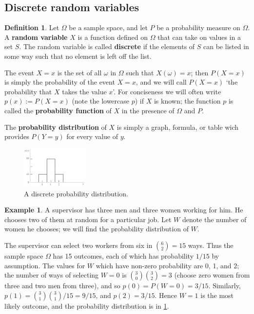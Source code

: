 \documentclass[a4paper,leqno]{article}
\numberwithin{equation}{section}
\theoremstyle{definition}
\newtheorem{defn}[equation]{Definition}
\newtheorem{ex}[equation]{Example}
\theoremstyle{remark}
\newcommand{\df}{\textbf}
\begin{document}
\subsection{Discrete random variables}

\begin{defn}\label{defn:randomvar1}
  Let $ \Omega $ be a sample space, and let $ P $ be a probability measure on $ \Omega $. A \df{random variable} $ X $ is a function defined
  on $ \Omega $ that can take on values in a set $ S $. The random variable is called \df{discrete} if the elements of $ S $ can be listed in
  some way such that no element is left off the list.

  The event $ X = x $ is the set of all $ \omega $ in $ \Omega $ such that $ X(\omega) = x $; then $ P(X = x) $ is simply the probability
  of the event $ X = x $, and we will call $ P(X = x) $ `the probability that $ X $ takes the value $ x $'. For conciseness we will often
  write $ p(x) := P(X = x) $ (note the lowercase $ p $) if $ X $ is known; the function $ p $ is called the \df{probability function} of $ X $
  in the presence of $ \Omega $ and $ P $.

  The \df{probability distribution} of $ X $ is simply a graph, formula, or table wich provides $ P(Y = y) $ for every value of $ y $.
\end{defn}

\begin{figure}
  \centering
  \includegraphics[width=0.3\textwidth]{pd1}
  \caption{A discrete probability distribution.\label{fig:pd1}}
\end{figure}

\begin{ex}\label{ex:pd1}
  A supervisor has three men and three women working for him. He chooses two of them at random for a particular job. Let $ W $ denote
  the number of women he chooses; we will find the probability distribution of $ W $.

  The supervisor can select two workers from six in $ \binom{6}{2} = 15 $ ways. Thus the sample space $ \Omega $ has 15 outcomes, each
  of which has probability $ 1/15 $ by assumption. The values for $ W $ which have non-zero probability are 0, 1, and 2; the number
  of ways of selecting $ W = 0 $ is $ \binom{3}{0} \binom{3}{2} = 3 $ (choose zero women from three and two men from three), and
  so $ p(0) = P(W = 0) = 3/15 $. Similarly, $ p(1) = \binom{3}{1}\binom{3}{1}/15 = 9/15 $, and $ p(2) = 3/15 $. Hence $ W = 1 $ is the most
  likely outcome, and the probability distribution is in \ref{fig:pd1}.
\end{ex}
\end{document}
